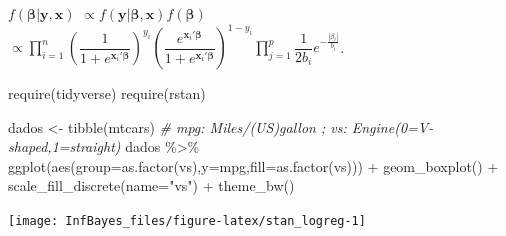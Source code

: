 \documentclass[
]{book}
\newenvironment{Shaded}{\begin{snugshade}}{\end{snugshade}}
\newcommand{\AttributeTok}[1]{\textcolor[rgb]{0.77,0.63,0.00}{#1}}
\newcommand{\CommentTok}[1]{\textcolor[rgb]{0.56,0.35,0.01}{\textit{#1}}}
\newcommand{\FunctionTok}[1]{\textcolor[rgb]{0.00,0.00,0.00}{#1}}
\newcommand{\NormalTok}[1]{#1}
\newcommand{\OtherTok}[1]{\textcolor[rgb]{0.56,0.35,0.01}{#1}}
\newcommand{\SpecialCharTok}[1]{\textcolor[rgb]{0.00,0.00,0.00}{#1}}
\newcommand{\StringTok}[1]{\textcolor[rgb]{0.31,0.60,0.02}{#1}}
\begin{document}
\(f(\boldsymbol\beta | \boldsymbol{y},\boldsymbol{x})\)
\(\propto f(\boldsymbol{y}|\boldsymbol\beta,\boldsymbol{x})f(\boldsymbol\beta)\)
\(\propto \displaystyle\prod_{i=1}^{n} \left(\dfrac{1}{1+e^{\boldsymbol x_i' \boldsymbol\beta}}\right)^{y_i}\left(\dfrac{e^{\boldsymbol x_i' \boldsymbol\beta}}{1+e^{\boldsymbol x_i' \boldsymbol\beta}}\right)^{1-y_i} \prod_{j=1}^{p} \dfrac{1}{2b_i} e^{-\frac{|\beta_i|}{b_i}}\).

\begin{Shaded}
\begin{Highlighting}[]
\FunctionTok{require}\NormalTok{(tidyverse)}
\FunctionTok{require}\NormalTok{(rstan)}

\NormalTok{dados }\OtherTok{\textless{}{-}} \FunctionTok{tibble}\NormalTok{(mtcars)}
\CommentTok{\# mpg:  Miles/(US)gallon ;  vs: Engine(0=V{-}shaped,1=straight)}
\NormalTok{dados }\SpecialCharTok{\%\textgreater{}\%} \FunctionTok{ggplot}\NormalTok{(}\FunctionTok{aes}\NormalTok{(}\AttributeTok{group=}\FunctionTok{as.factor}\NormalTok{(vs),}\AttributeTok{y=}\NormalTok{mpg,}\AttributeTok{fill=}\FunctionTok{as.factor}\NormalTok{(vs))) }\SpecialCharTok{+}
        \FunctionTok{geom\_boxplot}\NormalTok{() }\SpecialCharTok{+} \FunctionTok{scale\_fill\_discrete}\NormalTok{(}\AttributeTok{name=}\StringTok{"vs"}\NormalTok{) }\SpecialCharTok{+} \FunctionTok{theme\_bw}\NormalTok{()}
\end{Highlighting}
\end{Shaded}

\begin{center}\texttt{[image: InfBayes\_files/figure-latex/stan\_logreg-1]} \end{center}
\end{document}
